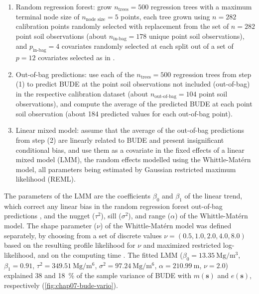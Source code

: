 {\begin{enumerate}
 \item Random regression forest: grow $n_{\text{trees}} = 500$ regression trees with a maximum terminal node 
 size of $n_{\text{node size}} = 5$ points, each tree grown using $n = 282$ calibration points randomly 
 selected with replacement from the set of $n = 282$ point soil observations (about $n_{\text{in-bag}} = 178$ 
 unique point soil observations), and $p_{\text{in-bag}} = 4$ covariates randomly selected at each split out 
 of a set of $p = 12$ covariates selected as in \citet{Samuel-RosaEtAl2015}.
 
 \item Out-of-bag predictions: use each of the $n_{\text{trees}} = 500$ regression trees from step (1) to 
 predict BUDE at the  point soil observations not included (out-of-bag) in the respective calibration dataset 
 (about $n_{\text{out-of-bag}} = 104$ point soil observations), and compute the average of the predicted BUDE 
 at each point soil observation (about 184 predicted values for each out-of-bag point).
 
 \item Linear mixed model: assume that the average of the out-of-bag predictions from step (2) are linearly 
 related to BUDE and present insignificant conditional bias, and use them as a covariate in the fixed effects 
 of a linear mixed model (LMM), the random effects modelled using the Whittle-Matérn model, all parameters 
 being estimated by Gaussian restricted maximum likelihood (REML).
\end{enumerate}

The parameters of the LMM are the coefficients $\beta_0$ and $\beta_1$ of the linear trend, which correct 
any linear bias in the random regression forest out-of-bag predictions \cite{LiawEtAl2002}, and the nugget 
($\tau^2$), sill ($\sigma^2$), and range ($\alpha$) of the Whittle-Matérn model. The shape parameter 
($\nu$) of the Whittle-Matérn model was defined separately, by choosing from a set of discrete values 
$\nu = (0.5, 1.0, 2.0, 4.0, 8.0)$ based on the resulting profile likelihood for $\nu$ and maximized restricted 
log-likelihood, and on the computing time \cite{Stein1999, DiggleEtAl2007}. The fitted LMM 
($\beta_0 = \SI{13.35}{\mega\gram\per\cubic\metre}$, $\beta_1 = 0.91$, 
$\tau^2 = \SI{349.51}{\mega\gram\per\metre\tothe{6}}$, $\sigma^2 = \SI{97.24}{\mega\gram\per\metre\tothe{6}}$, 
$\alpha = \SI{210.99}{\metre}$, $\nu = 2.0$) explained \num{38} and \SI{18}{\percent} of the sample variance of 
BUDE with $m(\boldsymbol{s})$ and $e(\boldsymbol{s})$, respectively (\autoref{fig:chap07-bude-vario}).

}

